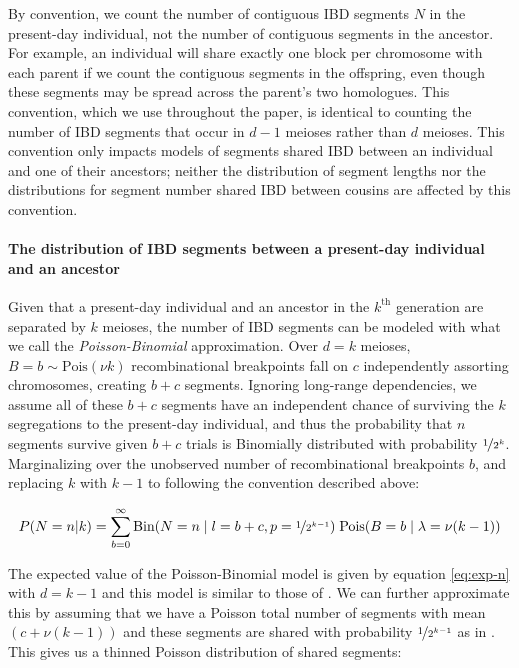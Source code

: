 \documentclass[11pt]{article}
\begin{document}
By convention, we count the number of contiguous IBD segments $N$ in the
present-day individual, not the number of contiguous segments in the ancestor.
For example, an individual will share exactly one block per chromosome with
each parent if we count the contiguous segments in the offspring, even though
these segments may be spread across the parent's two homologues. This
convention, which we use throughout the paper, is identical to counting the
number of IBD segments that occur in $d-1$ meioses rather than $d$ meioses.
This convention only impacts models of segments shared IBD between an
individual and one of their ancestors; neither the distribution of segment
lengths nor the distributions for segment number shared IBD between cousins are
affected by this convention.

\paragraph{The distribution of IBD segments between a present-day individual
and an ancestor} 
\label{sec:auto-dist-ibd-seg}

Given that a present-day individual and an ancestor in the $k^\text{th}$
generation are separated by $k$ meioses, the number of IBD segments can be
modeled with what we call the \emph{Poisson-Binomial} approximation. Over $d=k$
meioses, $B=b \sim \text{Pois}(\nu k)$ recombinational breakpoints fall on $c$
independently assorting chromosomes, creating $b + c$ segments. Ignoring
long-range dependencies, we assume all of these $b+c$ segments have an
independent chance of surviving the $k$ segregations to the present-day
individual, and thus the probability that $n$ segments survive given $b+c$
trials is Binomially distributed with probability $\nicefrac{1}{2^k}$.
Marginalizing over the unobserved number of recombinational breakpoints $b$,
and replacing $k$ with $k-1$ to following the convention described above:

\begin{equation}
  P(N=n | k) = \sum_{b=0}^\infty \text{Bin}(N=n \;|\; l=b+c,
p=\nicefrac{1}{2^{k-1}}) \; \text{Pois}(B=b \;|\; \lambda=\nu (k-1))
\end{equation}

The expected value of the Poisson-Binomial model is given by equation
\eqref{eq:exp-n} with $d=k-1$ and this model is similar to those of
\textcite{thomas:1994hg,Donnelly:1983fi}. We can further approximate this by
assuming that we have a Poisson total number of segments with mean $(c +
\nu(k-1))$ and these segments are shared with probability
$\nicefrac{1}{2^{k-1}}$ as in \textcite{huff2011maximum}. This gives us a
thinned Poisson distribution of shared segments:
\end{document}
